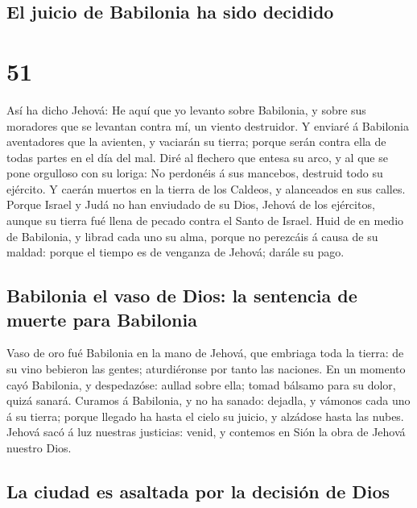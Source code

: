 \hypertarget{el-juicio-de-babilonia-ha-sido-decidido}{%
\subsection{El juicio de Babilonia ha sido
decidido}\label{el-juicio-de-babilonia-ha-sido-decidido}}

\hypertarget{section-50}{%
\section{51}\label{section-50}}

 Así ha dicho Jehová: He aquí que yo levanto sobre
Babilonia, y sobre sus moradores que se levantan contra mí, un viento
destruidor.  Y enviaré á Babilonia aventadores que la
avienten, y vaciarán su tierra; porque serán contra ella de todas partes
en el día del mal.  Diré al flechero que entesa su arco, y
al que se pone orgulloso con su loriga: No perdonéis á sus mancebos,
destruid todo su ejército.  Y caerán muertos en la tierra
de los Caldeos, y alanceados en sus calles.  Porque Israel
y Judá no han enviudado de su Dios, Jehová de los ejércitos, aunque su
tierra fué llena de pecado contra el Santo de Israel. 
Huid de en medio de Babilonia, y librad cada uno su alma, porque no
perezcáis á causa de su maldad: porque el tiempo es de venganza de
Jehová; darále su pago.

\hypertarget{babilonia-el-vaso-de-dios-la-sentencia-de-muerte-para-babilonia}{%
\subsection{Babilonia el vaso de Dios: la sentencia de muerte para
Babilonia}\label{babilonia-el-vaso-de-dios-la-sentencia-de-muerte-para-babilonia}}

 Vaso de oro fué Babilonia en la mano de Jehová, que
embriaga toda la tierra: de su vino bebieron las gentes; aturdiéronse
por tanto las naciones.  En un momento cayó Babilonia, y
despedazóse: aullad sobre ella; tomad bálsamo para su dolor, quizá
sanará.  Curamos á Babilonia, y no ha sanado: dejadla, y
vámonos cada uno á su tierra; porque llegado ha hasta el cielo su
juicio, y alzádose hasta las nubes.  Jehová sacó á luz
nuestras justicias: venid, y contemos en Sión la obra de Jehová nuestro
Dios.

\hypertarget{la-ciudad-es-asaltada-por-la-decisiuxf3n-de-dios}{%
\subsection{La ciudad es asaltada por la decisión de
Dios}\label{la-ciudad-es-asaltada-por-la-decisiuxf3n-de-dios}}

